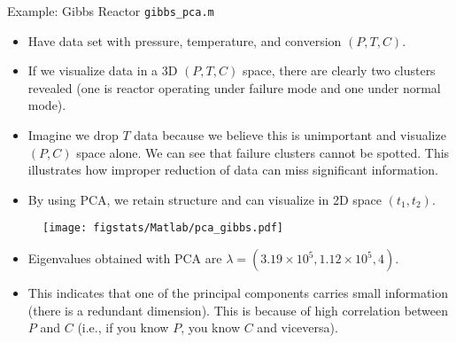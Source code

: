 \documentclass[9pt]{beamer}
\begin{document}
%
\begin{frame}{Example: Gibbs Reactor \footnotesize{\texttt{gibbs\_pca.m}}}

\begin{itemize}
\setlength{\itemsep}{3pt}
\item Have data set with pressure, temperature, and conversion $(P,T,C)$.
\item If we visualize data in a 3D $(P,T,C)$ space, there are clearly two clusters revealed (one is reactor operating under failure mode and one under normal mode).
\item Imagine we drop $T$ data because we believe this is unimportant and visualize $(P,C)$ space alone. We can see that   failure clusters cannot be spotted. This illustrates how improper reduction of data can miss significant information. 
\item By using PCA, we retain structure and can visualize in 2D space $(t_1,t_2)$.
\end{itemize}

\begin{figure}[!htb]
    \centering
	\texttt{[image: figstats/Matlab/pca\_gibbs.pdf]}
\end{figure}

\begin{itemize}
\item Eigenvalues obtained with PCA are $\lambda=(3.19\times 10^5,1.12\times 10^5,4)$. 
\item This indicates that one of the principal components carries small information (there is a redundant dimension). This is because of high correlation between $P$ and $C$ (i.e., if you know $P$, you know $C$ and viceversa). 
\end{itemize}


\end{frame}
\end{document}
